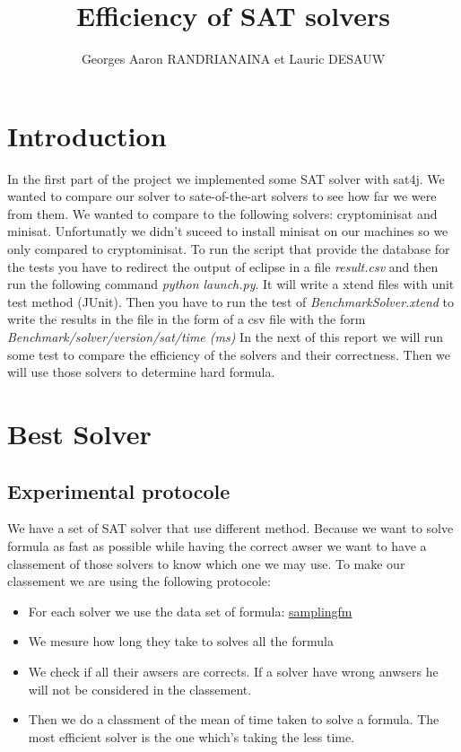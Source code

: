 \documentclass{article}
\title{Efficiency of SAT solvers}
\author{Georges Aaron RANDRIANAINA et Lauric DESAUW}
\begin{document}
\maketitle

\section{Introduction}
In the first part of the project we implemented some SAT solver with sat4j. We wanted to compare our solver to sate-of-the-art solvers to see how far we were from them. 
We wanted to compare to the following solvers: cryptominisat and minisat. Unfortunatly we didn't suceed to install minisat on our machines so we only compared to cryptominisat.
To run the script that provide the database for the tests you have to redirect the output of eclipse in a file \emph{result.csv} and then run the following command \emph{python launch.py}. It will write a xtend files with unit test method (JUnit). Then you have to run the test of \emph{BenchmarkSolver.xtend} to write the results in the file in the form of a csv file with the form \emph{Benchmark/solver/version/sat/time (ms)}
In the next of this report we will run some test to compare the efficiency of the solvers and their correctness. Then we will use those solvers to determine hard formula. 

\section{Best Solver}
\subsection{Experimental protocole}
We have a set of SAT solver that use different method. Because we want to solve formula as fast as possible while having the correct awser we want to have a classement of those solvers to know which one we may use. To make our classement we are using the following protocole:

\vskip 3mm

\begin{itemize}
\item For each solver we use the data set of formula: \href{https://github.com/diverse-project/samplingfm/tree/master/Benchmarks}{samplingfm}
\item We mesure how long they take to solves all the formula
\item We check if all their awsers are corrects. If a solver have wrong anwsers he will not be considered in the classement. 
\item  Then we do a classment of the mean of time taken to solve a formula. The most efficient solver is the one which's taking the less time. 
\end{itemize}
\end{document}
